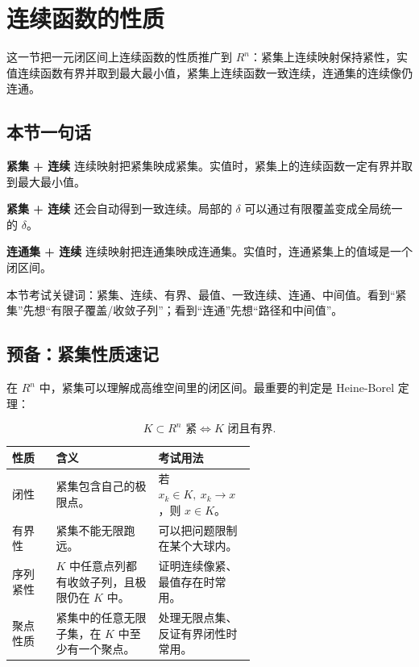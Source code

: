 \section{连续函数的性质}

这一节把一元闭区间上连续函数的性质推广到 \(R^n\)：紧集上连续映射保持紧性，实值连续函数有界并取到最大最小值，紧集上连续函数一致连续，连通集的连续像仍连通。

\subsection*{本节一句话}

\begin{conceptbox}
\textbf{紧集 + 连续}
连续映射把紧集映成紧集。实值时，紧集上的连续函数一定有界并取到最大最小值。
\end{conceptbox}

\begin{conceptbox}
\textbf{紧集 + 连续}
还会自动得到一致连续。局部的 \(\delta\) 可以通过有限覆盖变成全局统一的 \(\delta\)。
\end{conceptbox}

\begin{conceptbox}
\textbf{连通集 + 连续}
连续映射把连通集映成连通集。实值时，连通紧集上的值域是一个闭区间。
\end{conceptbox}

\begin{notebox}
本节考试关键词：紧集、连续、有界、最值、一致连续、连通、中间值。看到“紧集”先想“有限子覆盖/收敛子列”；看到“连通”先想“路径和中间值”。
\end{notebox}

\subsection*{预备：紧集性质速记}

在 \(R^n\) 中，紧集可以理解成高维空间里的闭区间。最重要的判定是 Heine-Borel 定理：

\[
      K\subset R^n\text{ 紧}
      \Longleftrightarrow
      K\text{ 闭且有界}.
    \]

\begin{center}
\small
\begin{tabularx}{\linewidth}{|>{\raggedright\arraybackslash}p{0.18\linewidth}|>{\raggedright\arraybackslash}p{0.42\linewidth}|>{\raggedright\arraybackslash}X|}
\hline
\textbf{性质} & \textbf{含义} & \textbf{考试用法} \\ \hline
闭性 & 紧集包含自己的极限点。 & 若 \(x_k\in K,\ x_k\to x\)，则 \(x\in K\)。 \\ \hline
有界性 & 紧集不能无限跑远。 & 可以把问题限制在某个大球内。 \\ \hline
序列紧性 & \(K\) 中任意点列都有收敛子列，且极限仍在 \(K\) 中。 & 证明连续像紧、最值存在时常用。 \\ \hline
聚点性质 & 紧集中的任意无限子集，在 \(K\) 中至少有一个聚点。 & 处理无限点集、反证有界闭性时常用。 \\ \hline
\end{tabularx}
\end{center}

